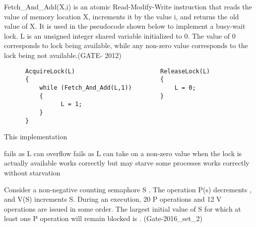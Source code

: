 
\begin{questyle}

  \question  Fetch\_And\_Add(X,i) is an atomic Read-Modify-Write instruction that reads the value of memory
             location X, increments it by the value i, and returns the old value of X.
             It is used in the pseudocode shown below to implement a busy-wait lock.
             L is an unsigned integer shared variable initialized to 0.
             The value of 0 corresponds to lock being available, while any non-zero value corresponds to the lock
             being not available.(GATE- 2012)

  \begin{lstlisting}
      AcquireLock(L)                        ReleaseLock(L)
      {                                     {
          while (Fetch_And_Add(L,1))            L = 0;
          {                                 }
                L = 1;
          }
      }

  \end{lstlisting}
  This implementation

  \begin{choices}
    \choice  fails as L can overflow
    \choice  fails as L can take on a non-zero value when the lock is actually available
    \choice  works correctly but may starve some processes
    \choice  works correctly without starvation
  \end{choices}

  \end{questyle}




\begin{questyle}

  \question  Consider a non-negative counting semaphore S . The operation P(s) decrements , and V(S) increments S.
             During an execution, 20 P operations and 12 V operations are issued in some order.
             The largest initial value of S for which at least one P operation will remain blocked is \fillin[]. (Gate-2016\_set\_2)
  \end{questyle}



